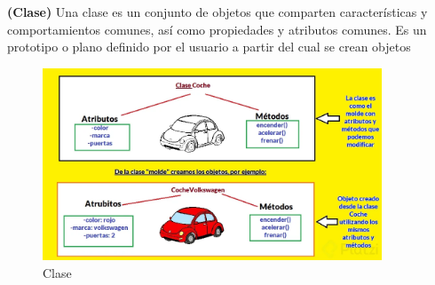 \documentclass[../main.tex]{subfiles}
\begin{document}
        \begin{definition} \textbf{(Clase)}
            Una clase es un conjunto de objetos que comparten características y comportamientos comunes, así como propiedades y atributos comunes. Es un prototipo o plano definido por el usuario a partir del cual se crean objetos

            \begin{figure}[ht]
                \centering
                \includegraphics[width=0.9\textwidth]{../images/clase.png}
                \caption{Clase}
                \label{fig:clase_auto}
            \end{figure}

        \end{definition}
\end{document}
